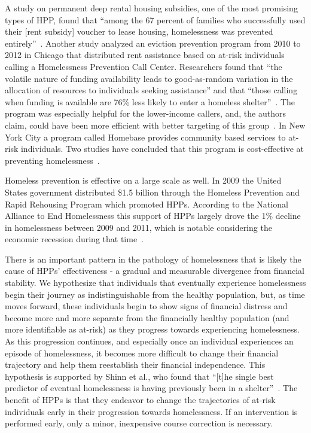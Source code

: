 \documentclass[10pt,letterpaper]{article}
\begin{document}
A study on permanent deep rental housing subsidies, one of the most promising types of HPP, found that ``among the 67 percent of families who successfully used their [rent subsidy] voucher to lease housing, homelessness was prevented entirely''~\cite{shinn2019homelessness}. Another study analyzed an eviction prevention program from 2010 to 2012 in Chicago that distributed rent assistance based on at-risk individuals calling a Homelessness Prevention Call Center. Researchers found that ``the volatile nature of funding availability leads to good-as-random variation in the allocation of resources to individuals seeking assistance'' and that ``those calling when funding is available are 76\% less likely to enter a homeless shelter''~\cite{evans2016impact}. The program was especially helpful for the lower-income callers, and, the authors claim, could have been more efficient with better targeting of this group~\cite{evans2016impact}. In New York City a program called Homebase provides community based services to at-risk individuals. Two studies have concluded that this program is cost-effective at preventing homelessness~\cite{rolston2013evaluation, goodman2016homelessness}. 

Homeless prevention is effective on a large scale as well. In 2009 the United States government distributed \$1.5 billion through the Homeless Prevention and Rapid Rehousing Program which promoted HPPs. According to the National Alliance to End Homelessness this support of HPPs largely drove the 1\% decline in homelessness between 2009 and 2011, which is notable considering the economic recession during that time~\cite{shinn2013efficient}.

There is an important pattern in the pathology of homelessness that is likely the cause of HPPs' effectiveness - a gradual and measurable divergence from financial stability. We hypothesize that individuals that eventually experience homelessness begin their journey as indistinguishable from the healthy population, but, as time moves forward, these individuals begin to show signs of financial distress and become more and more separate from the financially healthy population (and more identifiable as at-risk) as they progress towards experiencing homelessness. As this progression continues, and especially once an individual experiences an episode of homelessness, it becomes more difficult to change their financial trajectory and help them reestablish their financial independence. This hypothesis is supported by Shinn et al., who found that ``[t]he single best predictor of eventual homelessness is having previously been in a shelter''~\cite{shinn2019homelessness}. The benefit of HPPs is that they endeavor to change the trajectories of at-risk individuals early in their progression towards homelessness. If an intervention is performed early, only a minor, inexpensive course correction is necessary. 
\end{document}
